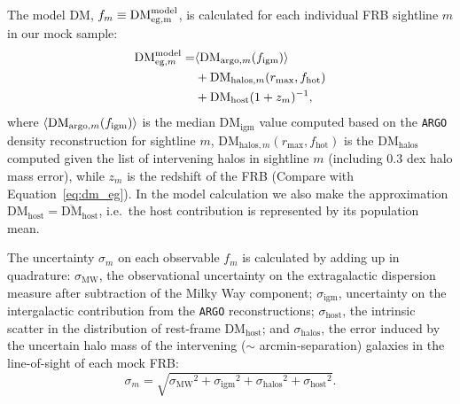 \documentclass[twocolumn]{aastex63}
\newcommand{\dmhalo}{\ensuremath{\mathrm{DM}_\mathrm{halos}}}
\newcommand{\dmigm}{\ensuremath{\mathrm{DM}_\mathrm{igm}}}
\newcommand{\dmhost}{\ensuremath{\mathrm{DM}_\mathrm{host}}}
\newcommand{\bardmhost}{\ensuremath{\overline{\mathrm{DM}}_\mathrm{host}}}
\newcommand{\sigmw}{\ensuremath{\sigma_\mathrm{MW}}}
\newcommand{\sigigm}{\ensuremath{\sigma_\mathrm{igm}}}
\newcommand{\sighalo}{\ensuremath{\sigma_\mathrm{halos}}}
\newcommand{\sighost}{\ensuremath{\sigma_\mathrm{host}}}
\newcommand{\figm}{\ensuremath{f_\mathrm{igm}}}
\newcommand{\fhot}{\ensuremath{f_\mathrm{hot}}}
\newcommand{\rmax}{\ensuremath{r_\mathrm{max}}}
\newcommand{\argo}{\texttt{ARGO}}
\begin{document}
\begin{CJK*}{UTF8}{gbsn}
The model DM, $f_m\equiv {\rm DM}^\mathrm{model}_\mathrm{eg,m}$, is calculated for each individual FRB sightline $m$ in our mock sample:
\begin{align}
{\rm DM}^\mathrm{model}_{\mathrm{eg},m} =& \langle {\rm DM}_{\mathrm{argo},m}(\figm) \rangle  \nonumber \\ &+ \mathrm{DM}_{\mathrm{halos},m}(\rmax, \fhot) \nonumber \\ &+  \mathrm{DM_{host}}(1+z_m)^{-1},
\end{align}
where $\langle {\rm DM}_{\mathrm{argo},m}(\figm) \rangle$ is the median \dmigm{} value
computed based on the \argo{} density reconstruction for sightline $m$, 
$\mathrm{DM}_{\mathrm{halos},m}(\rmax, \fhot)$ is the \dmhalo{} computed given the 
list of intervening halos in sightline $m$ (including 0.3 dex halo mass error), while
$z_m$ is the redshift of the FRB (Compare with Equation~\ref{eq:dm_eg}).
{In the model calculation we also make the approximation $\dmhost = \bardmhost$, i.e.\ the host contribution
is represented by its population mean.}

The uncertainty $\sigma_m$ on each observable $f_m$ is calculated by adding up in quadrature: \sigmw, the observational uncertainty on the extragalactic dispersion measure after subtraction of the Milky Way component; \sigigm, uncertainty on the intergalactic contribution from the \argo{} reconstructions; { \sighost{}, the intrinsic scatter in the distribution of rest-frame \dmhost}; and
\sighalo, the error induced by the uncertain halo mass of the intervening ($\sim$ arcmin-separation) galaxies in the line-of-sight of each mock FRB:
\begin{equation}\label{eq:fishersig}
    \sigma_m = \sqrt{ \sigmw^2 + \sigigm^2 + \sighalo^2 + \sighost^2}.
\end{equation}


\end{CJK*}
\end{document}

